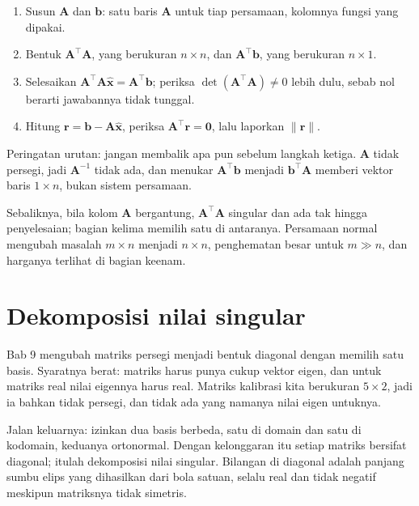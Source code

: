 \begin{resep}
\begin{enumerate}
  \item Susun $\mathbf{A}$ dan $\mathbf{b}$: satu baris $\mathbf{A}$ untuk tiap persamaan, kolomnya fungsi yang dipakai.
  \item Bentuk $\mathbf{A}^{\top}\mathbf{A}$, yang berukuran $n\times n$, dan $\mathbf{A}^{\top}\mathbf{b}$, yang berukuran $n\times1$.
  \item Selesaikan $\mathbf{A}^{\top}\mathbf{A}\hat{\mathbf{x}}=\mathbf{A}^{\top}\mathbf{b}$; periksa $\det(\mathbf{A}^{\top}\mathbf{A})\ne0$ lebih dulu, sebab nol berarti jawabannya tidak tunggal.
  \item Hitung $\mathbf{r}=\mathbf{b}-\mathbf{A}\hat{\mathbf{x}}$, periksa $\mathbf{A}^{\top}\mathbf{r}=\mathbf{0}$, lalu laporkan $\|\mathbf{r}\|$.
\end{enumerate}
Peringatan urutan: jangan membalik apa pun sebelum langkah ketiga. $\mathbf{A}$ tidak persegi, jadi $\mathbf{A}^{-1}$ tidak ada, dan menukar $\mathbf{A}^{\top}\mathbf{b}$ menjadi $\mathbf{b}^{\top}\mathbf{A}$ memberi vektor baris $1\times n$, bukan sistem persamaan.
\end{resep}

Sebaliknya, bila kolom $\mathbf{A}$ bergantung, $\mathbf{A}^{\top}\mathbf{A}$ singular
dan ada tak hingga penyelesaian; bagian kelima memilih satu di antaranya. Persamaan
normal mengubah masalah $m\times n$ menjadi $n\times n$, penghematan besar untuk
$m\gg n$, dan harganya terlihat di bagian keenam.

\section{Dekomposisi nilai singular}

Bab 9 mengubah matriks persegi menjadi bentuk diagonal dengan memilih satu basis.
Syaratnya berat: matriks harus punya cukup vektor eigen, dan untuk matriks real nilai
eigennya harus real. Matriks kalibrasi kita berukuran $5\times2$, jadi ia bahkan tidak
persegi, dan tidak ada yang namanya nilai eigen untuknya.

Jalan keluarnya: izinkan dua basis berbeda, satu di domain dan satu di kodomain,
keduanya ortonormal. Dengan kelonggaran itu setiap matriks bersifat diagonal; itulah
dekomposisi nilai singular. Bilangan di diagonal adalah panjang sumbu elips yang
dihasilkan dari bola satuan, selalu real dan tidak negatif meskipun matriksnya tidak
simetris.

